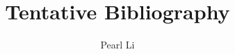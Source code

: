 \documentclass[11pt]{article}
\begin{document}
\title{Tentative Bibliography}
\author{Pearl Li}
\maketitle

\nocite{*}



\end{document}
